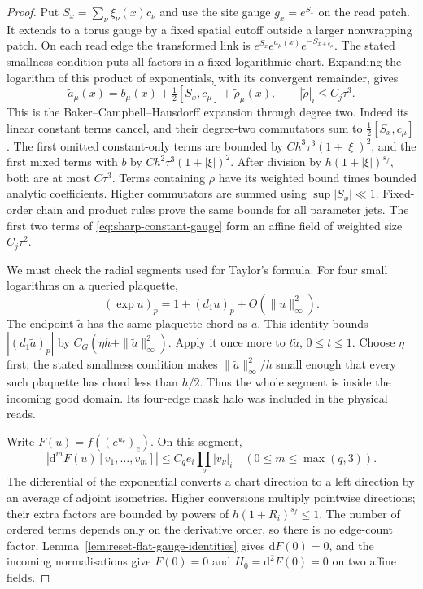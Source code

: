 \documentclass[11pt,reqno]{amsart}
\numberwithin{equation}{section}
\theoremstyle{definition}
\theoremstyle{remark}
\newcommand{\dd}{\mathrm d}
\begin{document}
\begin{proof}
Put \(S_x=\sum_\nu\xi_\nu(x)c_\nu\) and use the site
gauge \(g_x=e^{S_x}\) on the read patch. It extends to a
torus gauge by a fixed spatial cutoff outside a larger
nonwrapping patch. On each read edge the transformed link is
\(e^{S_x}e^{a_\mu(x)}e^{-S_{x+e_\mu}}\).
The stated smallness condition puts all factors in a fixed
logarithmic chart. Expanding the logarithm of this product
of exponentials, with its convergent remainder, gives
\begin{equation}
 \widetilde a_\mu(x)
      =b_\mu(x)+\tfrac12[S_x,c_\mu]+\widetilde\rho_\mu(x),
                  \qquad |\widetilde\rho|_i\le C_j\tau^3.
 \label{eq:sharp-constant-gauge}
\end{equation}
This is the Baker--Campbell--Hausdorff expansion through
degree two. Indeed its linear constant terms cancel, and
their degree-two commutators sum to \(\frac12[S_x,c_\mu]\).
The first omitted constant-only terms are bounded by
\(Ch^3\tau^3(1+|\xi|)^2\), and the first mixed terms
with \(b\) by \(Ch^2\tau^3(1+|\xi|)^2\). After division
by \(h(1+|\xi|)^{s_f}\), both are at most \(C\tau^3\).
Terms containing \(\rho\) have its weighted bound times
bounded analytic coefficients. Higher commutators are
summed using \(\sup|S_x|\ll1\). Fixed-order chain and
product rules prove the same bounds for all parameter
jets. The first two terms of
\eqref{eq:sharp-constant-gauge} form an affine field
of weighted size \(C_j\tau^2\).

We must check the radial segments used for Taylor's formula.
For four small logarithms on a queried plaquette,
\[
        (\exp u)_p=1+(d_1u)_p+O(\|u\|_\infty^2).
\]
The endpoint \(\widetilde a\) has the same plaquette
chord as \(a\). This identity bounds
\(|(d_1\widetilde a)_p|\) by
\(C_G(\eta h+\|\widetilde a\|_\infty^2)\).
Apply it once more to \(t\widetilde a\), \(0\le t\le1\).
Choose \(\eta\) first; the stated smallness condition makes
\(\|\widetilde a\|_\infty^2/h\) small enough that every
such plaquette has chord less than \(h/2\).
Thus the whole segment is inside the incoming good domain.
Its four-edge mask halo was included in the physical reads.

Write \(F(u)=f((e^{u_e})_e)\). On this segment,
\[
 |\dd^mF(u)[v_1,\ldots,v_m]|
                         \le C_q e_i\prod_\nu|v_\nu|_i
                  \quad(0\le m\le\max(q,3)).
\]
The differential of the exponential converts a chart
direction to a left direction by an average of adjoint
isometries. Higher conversions multiply pointwise
directions; their extra factors are bounded by powers of
\(h(1+R_i)^{s_f}\le1\). The number of ordered terms depends
only on the derivative order, so there is no edge-count
factor. Lemma~\ref{lem:reset-flat-gauge-identities} gives
\(\dd F(0)=0\), and the incoming normalisations give
\(F(0)=0\) and \(H_0=\dd^2F(0)=0\) on two affine fields.


\end{proof}
\end{document}
